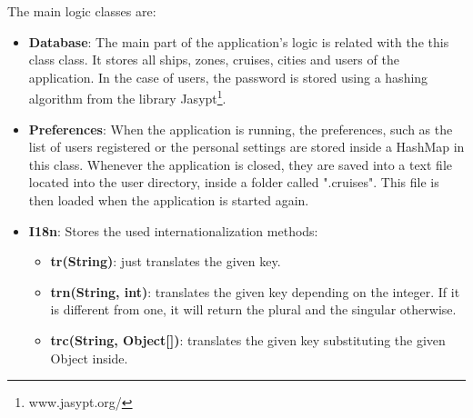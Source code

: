 \documentclass[12pt]{article}
\begin{document}
   The main logic classes are:
   \begin{itemize}
	   	\item \textbf{Database}: The main part of the application's logic is related with the this class class. It stores all ships, zones, cruises, cities and users of the application. In the case of users, the password is stored using a hashing algorithm from the library Jasypt\footnote{www.jasypt.org/}.
	   	\item \textbf{Preferences}: When the application is running, the preferences, such as the list of users registered or the personal settings are stored inside a HashMap in this class. Whenever the application is closed, they are saved into a text file located into the user directory, inside a folder called ".cruises". This file is then loaded when the application is started again.
	   	\item \textbf{I18n}: Stores the used internationalization methods:
		\begin{itemize}
			\item \textbf{tr(String)}: just translates the given key.
			\item \textbf{trn(String, int)}: translates the given key depending on the integer. If it is different from one, it will return the plural and the singular otherwise.
			\item \textbf{trc(String, Object[])}: translates the given key substituting the given Object inside.
		\end{itemize}
   \end{itemize}
\end{document}
